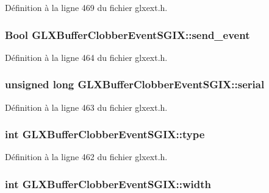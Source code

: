 Définition à la ligne 469 du fichier glxext.\-h.

\hypertarget{struct_g_l_x_buffer_clobber_event_s_g_i_x_af43bf0edbe40a74ef58dfb546a75118b}{
\subsubsection[{send\-\_\-event}]{\setlength{\rightskip}{0pt plus 5cm}Bool G\-L\-X\-Buffer\-Clobber\-Event\-S\-G\-I\-X\-::send\-\_\-event}}\label{struct_g_l_x_buffer_clobber_event_s_g_i_x_af43bf0edbe40a74ef58dfb546a75118b}


Définition à la ligne 464 du fichier glxext.\-h.

\hypertarget{struct_g_l_x_buffer_clobber_event_s_g_i_x_ac295e3276a7986eeae4d6a2a28c7e0b7}{
\subsubsection[{serial}]{\setlength{\rightskip}{0pt plus 5cm}unsigned long G\-L\-X\-Buffer\-Clobber\-Event\-S\-G\-I\-X\-::serial}}\label{struct_g_l_x_buffer_clobber_event_s_g_i_x_ac295e3276a7986eeae4d6a2a28c7e0b7}


Définition à la ligne 463 du fichier glxext.\-h.

\hypertarget{struct_g_l_x_buffer_clobber_event_s_g_i_x_a36e3e8a5feea664623ea43d0f273b63a}{
\subsubsection[{type}]{\setlength{\rightskip}{0pt plus 5cm}int G\-L\-X\-Buffer\-Clobber\-Event\-S\-G\-I\-X\-::type}}\label{struct_g_l_x_buffer_clobber_event_s_g_i_x_a36e3e8a5feea664623ea43d0f273b63a}


Définition à la ligne 462 du fichier glxext.\-h.

\hypertarget{struct_g_l_x_buffer_clobber_event_s_g_i_x_adad23535733161528427584a42bfc6eb}{
\subsubsection[{width}]{\setlength{\rightskip}{0pt plus 5cm}int G\-L\-X\-Buffer\-Clobber\-Event\-S\-G\-I\-X\-::width}}\label{struct_g_l_x_buffer_clobber_event_s_g_i_x_adad23535733161528427584a42bfc6eb}


